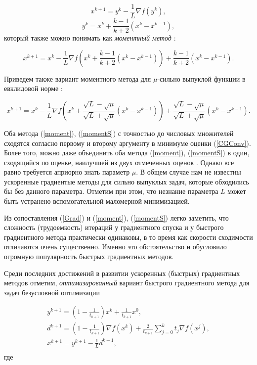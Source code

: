   \[
    x^{k+1}=y^k-\frac{1}{L}\nabla f\left( {y^k} \right),
  \]
  \[
    y^k=x^k+\frac{k-1}{k+2}\left( {x^k-x^{k-1}} \right),
  \]
  который также можно понимать как \textit{моментный метод} \cite{su2014differential}:

  \begin{equation}
  \label{moment}
    x^{k+1}=x^k-\frac{1}{L}\nabla f\left( {x^k+\frac{k-1}{k+2}\left( {x^k-x^{k-1}} \right)} \right)+\frac{k-1}{k+2}\left( {x^k-x^{k-1}} \right).
  \end{equation}

  Приведем также вариант моментного метода для $\mu $-сильно выпуклой функции в евклидовой норме \cite{nesterov2013introductory}:

  \begin{equation}
  \label{momentS}
    x^{k+1}=x^k-\frac{1}{L}\nabla f\left( {x^k+\frac{\sqrt L -\sqrt \mu }{\sqrt L +\sqrt \mu }\left( {x^k-x^{k-1}} \right)} \right)+\frac{\sqrt L -\sqrt \mu }{\sqrt L +\sqrt \mu }\left( {x^k-x^{k-1}} \right).
  \end{equation}

  Оба метода (\ref{moment}), (\ref{momentS}) с точностью до числовых множителей сходятся согласно первому и второму аргументу в минимуме оценки (\ref{CGConv}). Более того, можно даже объединить оба метода (\ref{moment}), (\ref{momentS}) в один, сходящийся по оценке, наилучшей из двух отмеченных оценок \cite{nesterov2013introductory}. Однако все равно требуется априорно знать параметр $\mu$. В общем случае нам не известны ускоренные градиентые методы для сильно выпуклых задач, которые обходились бы без данного параметра. Отметим при этом, что незнание параметра $L$ может быть устранено вспомогательной маломерной минимизацией.

  \iffalse
    Из сопоставления (\ref{Grad}) и (\ref{moment}), (\ref{momentS}) легко заметить, что сложность (трудоемкость) итераций у градиентного спуска и у быстрого градиентного метода практически одинаковы, в то время как скорости сходимости отличаются очень существенно. Именно это обстоятельство и обусловило огромную популярность быстрых градиентных методов. 

    Среди последних достижений в развитии ускоренных (быстрых) градиентных методов отметим, \textit{оптимизированный} вариант быстрого градиентного метода для задач безусловной оптимизации \cite{drori2018efficient}

    \begin{equation}
    \label{optim}
    \begin{array}{c}
     y^{k+1}=\left( {1-\frac{1}{t_{k+1} }} \right)x^k+\frac{1}{t_{k+1} }x^0, \\ 
     d^{k+1}=\left( {1-\frac{1}{t_{k+1} }} \right)\nabla f\left( {x^k} 
    \right)+\frac{2}{t_{k+1} }\sum_{j=0}^k {t_j \nabla f\left( {x^j} 
    \right)} , \\ 
     x^{k+1}=y^{k+1}-\frac{1}{L}d^{k+1}, \\ 
     \end{array}
    \end{equation}
    где

